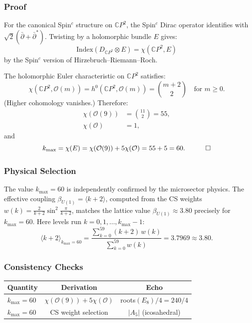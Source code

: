 \subsubsection{Proof}

For the canonical Spin$^c$ structure on $\mathbb{C}P^2$, the Spin$^c$ Dirac operator identifies with $\sqrt{2}(\bar\partial + \bar\partial^*)$. Twisting by a holomorphic bundle $E$ gives:
\begin{equation}
\mathrm{Index}(D_{\mathbb{C}P^2} \otimes E) = \chi(\mathbb{C}P^2, E)
\end{equation}
by the Spin$^c$ version of Hirzebruch--Riemann--Roch.

The holomorphic Euler characteristic on $\mathbb{C}P^2$ satisfies:
\begin{equation}
\chi(\mathbb{C}P^2, \mathcal{O}(m)) = h^0(\mathbb{C}P^2, \mathcal{O}(m)) = \binom{m+2}{2} \quad \text{for } m \geq 0.
\end{equation}
(Higher cohomology vanishes.) Therefore:
\begin{align}
\chi(\mathcal{O}(9)) &= \binom{11}{2} = 55, \\
\chi(\mathcal{O}) &= 1,
\end{align}
and
\begin{equation}
k_{\max} = \chi(E) = \chi(\mathcal{O}(9)) + 5\chi(\mathcal{O}) = 55 + 5 = 60. \quad \qed
\end{equation}

\subsubsection{Physical Selection}

The value $k_{\max} = 60$ is independently confirmed by the microsector physics. The effective coupling $\beta_{U(1)} = \langle k + 2 \rangle$, computed from the CS weights $w(k) = \frac{2}{k+2}\sin^2\frac{\pi}{k+2}$, matches the lattice value $\beta_{U(1)} \approx 3.80$ precisely for $k_{\max} = 60$. Here levels run $k = 0, 1, \ldots, k_{\max} - 1$:
\begin{equation}
\langle k + 2 \rangle_{k_{\max}=60} = \frac{\sum_{k=0}^{59} (k+2)\, w(k)}{\sum_{k=0}^{59} w(k)} = 3.7969 \approx 3.80.
\end{equation}

\subsubsection{Consistency Checks}

\begin{center}
\renewcommand{\arraystretch}{1.3}
\begin{tabular}{lcc}
\toprule
Quantity & Derivation & Echo \\
\midrule
$k_{\max} = 60$ & $\chi(\mathcal{O}(9)) + 5\chi(\mathcal{O})$ & roots$(E_8)/4 = 240/4$ \\
$k_{\max} = 60$ & CS weight selection & $|A_5|$ (icosahedral) \\
\bottomrule
\end{tabular}
\end{center}

